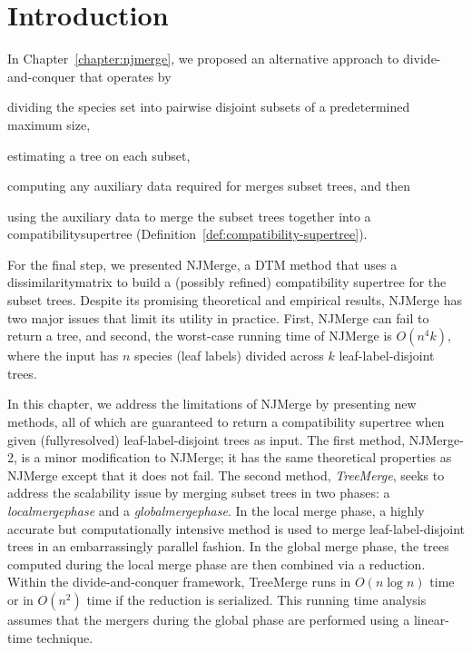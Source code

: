 \section{Introduction}
In Chapter~\ref{chapter:njmerge}, we proposed an alternative approach to divide-and-conquer that operates by
\begin{enumerate*}[label=(\roman*)]
	\item 
	dividing the species set into pairwise disjoint subsets of a predetermined maximum size, 
	\item 
	estimating a tree on each subset, 
	\item
	computing any auxiliary data required for \glspl{merge} subset trees, and then
	\item
	 using the auxiliary data to merge the subset trees together into a \gls{compatibilitysupertree} (Definition~\ref{def:compatibility-supertree}).
\end{enumerate*}
For the final step, we presented \gls{NJMerge}, a \gls{DTM} method that uses a \gls{dissimilaritymatrix} to build a (possibly refined) compatibility supertree for the subset trees.
Despite its promising theoretical and empirical results, NJMerge has two major issues that limit its utility in practice.
First, NJMerge can fail to return a tree, and second, the worst-case running time of NJMerge is $O(n^4k)$, where the input has $n$ species (leaf labels) divided across $k$ \gls{leaf-label-disjoint} trees.

In this chapter, we address the limitations of NJMerge by presenting new methods, all of which are guaranteed to return a compatibility supertree when given (\gls{fullyresolved}) leaf-label-disjoint trees as input.
The first method, NJMerge-2, is a minor modification to NJMerge; it has the same theoretical properties as NJMerge except that it does not fail.
The second method, \textit{\gls{TreeMerge}}, seeks to address the scalability issue by merging subset trees in two phases: a \textit{\gls{localmergephase}} and a \textit{\gls{globalmergephase}}.
In the local merge phase, a highly accurate but computationally intensive method is used to merge leaf-label-disjoint trees in an embarrassingly parallel fashion. 
In the global merge phase, the trees computed during the local merge phase are then combined via a reduction.
Within the divide-and-conquer framework, TreeMerge runs in $O(n \log{n})$ time or in $O(n^2)$ time if the reduction is serialized. 
This running time analysis assumes that the mergers during the global phase are performed using a linear-time technique.

